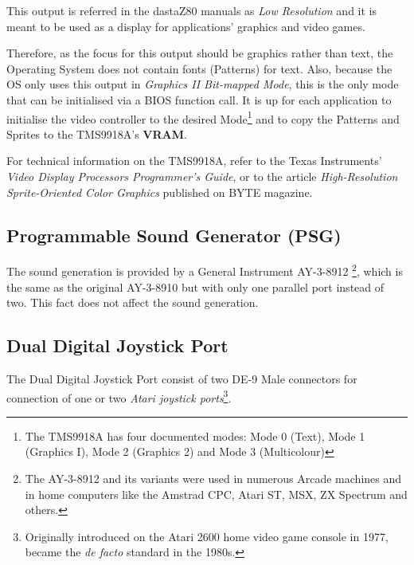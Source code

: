 \documentclass[a4paper,11pt]{article}
\begin{document}
    This output is referred in the dastaZ80 manuals as \textit{Low Resolution}
    and it is meant to be used as a display for applications' graphics and video
    games.

    Therefore, as the focus for this output should be graphics rather than text,
    the Operating System does not contain fonts (Patterns) for text. Also,
    because the OS only uses this output in \textit{Graphics II Bit-mapped Mode},
    this is the only mode that can be initialised via a BIOS function call. It
    is up for each application to initialise the video controller to the desired
    Mode\footnote{The TMS9918A has four documented modes: Mode 0 (Text), Mode 1
    (Graphics I), Mode 2 (Graphics 2) and Mode 3 (Multicolour)} and to copy the
    Patterns and Sprites to the TMS9918A's \textbf{VRAM}.

    For technical information on the TMS9918A, refer to the Texas Instruments'
    \textit{Video Display Processors Programmer's Guide}\cite{ti1}, or to the article
    \textit{High-Resolution Sprite-Oriented Color Graphics}\cite{ciarcia2}
    published on BYTE magazine.

    \subsection{Programmable Sound Generator (PSG)}

    The sound generation is provided by a General Instrument AY-3-8912
    \footnote{The AY-3-8912 and its variants were used in numerous Arcade
    machines and in home computers like the Amstrad CPC, Atari ST, MSX, ZX
    Spectrum and others.}, which is the same as the original AY-3-8910 but with
    only one parallel port instead of two. This fact does not affect the
    sound generation.

    \subsection{Dual Digital Joystick Port}

    The Dual Digital Joystick Port consist of two DE-9 Male connectors for
    connection of one or two \textit{Atari joystick ports}\footnote{Originally introduced
    on the Atari 2600 home video game console in 1977, became the \textit{de
    facto} standard in the 1980s.}.
\end{document}
